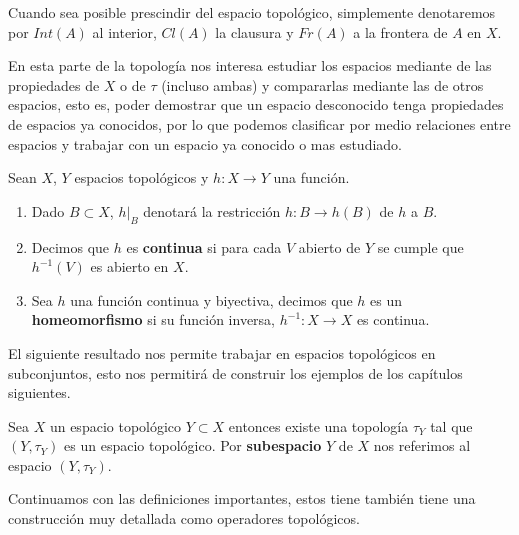 \begin{cn}
Cuando sea posible prescindir del espacio topológico, simplemente denotaremos por $Int(A)$ al interior, $Cl(A)$ la clausura y  $Fr(A)$ a la frontera de $A$ en $X$.
\end{cn}

En esta parte de la topología nos interesa estudiar los espacios  mediante de las propiedades de $X$ o de $\tau$ (incluso ambas) y compararlas mediante las de otros espacios, esto es, poder demostrar que un espacio desconocido tenga propiedades de espacios ya conocidos, por lo que podemos clasificar por medio relaciones entre espacios y trabajar con un espacio ya conocido o mas estudiado. 

\begin{df}
Sean $X$, $Y$ espacios topológicos y $h:X \to Y$  una función.
 
\begin{enumerate}

	\item Dado $B \subset X$, $h|_B$ denotará la restricción $h:B \to h(B)$ de $h$ a $B$. 
	
	\item Decimos que $h$ es \textbf{continua} si para cada $V$ abierto de $Y$ se cumple que $h^{-1}(V)$ es abierto en $X$.
	
	\item Sea $h$ una función continua y biyectiva, decimos que $h$ es un \textbf{homeomorfismo} si su función inversa, $h^{-1}:X \to X$ es continua. 
	
\end{enumerate}
\end{df}

El siguiente resultado nos permite trabajar en espacios topológicos en subconjuntos, esto nos permitirá de construir los ejemplos de los capítulos siguientes. 

\begin{te}
Sea $X$ un espacio topológico $Y \subset X$ entonces existe una topología $\tau_Y$ tal que $(Y,\tau_Y)$ es un espacio topológico. Por \textbf{subespacio} $Y$ de $X$ nos referimos al espacio $(Y, \tau_Y)$.
\end{te}

Continuamos con las definiciones importantes, estos tiene también  tiene una construcción muy detallada como operadores topológicos.

